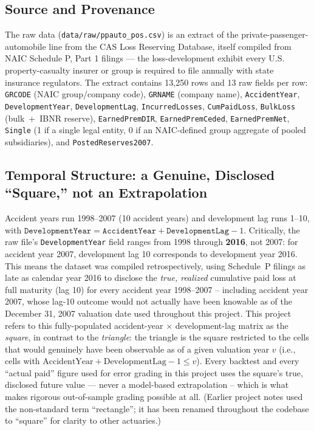 \documentclass[11pt]{article}
\begin{document}
\subsection{Source and Provenance}

The raw data (\texttt{data/raw/ppauto\_pos.csv}) is an extract of the private-passenger-automobile
line from the CAS Loss Reserving Database, itself compiled from NAIC Schedule P, Part 1 filings ---
the loss-development exhibit every U.S. property-casualty insurer or group is required to file
annually with state insurance regulators. The extract contains 13{,}250 rows and 13 raw fields per
row: \texttt{GRCODE} (NAIC group/company code), \texttt{GRNAME} (company name), \texttt{AccidentYear},
\texttt{DevelopmentYear}, \texttt{DevelopmentLag}, \texttt{IncurredLosses}, \texttt{CumPaidLoss},
\texttt{BulkLoss} (bulk~+~IBNR reserve), \texttt{EarnedPremDIR}, \texttt{EarnedPremCeded},
\texttt{EarnedPremNet}, \texttt{Single} (1 if a single legal entity, 0 if an NAIC-defined group
aggregate of pooled subsidiaries), and \texttt{PostedReserves2007}.

\subsection{Temporal Structure: a Genuine, Disclosed ``Square,'' not an Extrapolation}
\label{sec:square}

Accident years run 1998--2007 (10 accident years) and development lag runs 1--10, with
$\texttt{DevelopmentYear} = \texttt{AccidentYear} + \texttt{DevelopmentLag} - 1$. Critically, the
raw file's \texttt{DevelopmentYear} field ranges from 1998 through \textbf{2016}, not 2007: for
accident year 2007, development lag 10 corresponds to development year 2016. This means the
dataset was compiled retrospectively, using Schedule~P filings as late as calendar year 2016 to
disclose the \emph{true, realized} cumulative paid loss at full maturity (lag 10) for every
accident year 1998--2007 -- including accident year 2007, whose lag-10 outcome would not actually
have been knowable as of the December 31, 2007 valuation date used throughout this project. This
project refers to this fully-populated accident-year $\times$ development-lag matrix as the
\emph{square}, in contrast to the \emph{triangle}: the triangle is the square restricted to the
cells that would genuinely have been observable as of a given valuation year $v$ (i.e., cells with
$\text{AccidentYear} + \text{DevelopmentLag} - 1 \le v$). Every backtest and every ``actual paid''
figure used for error grading in this project uses the square's true, disclosed future value ---
never a model-based extrapolation -- which is what makes rigorous out-of-sample grading possible
at all. (Earlier project notes used the non-standard term ``rectangle''; it has been renamed
throughout the codebase to ``square'' for clarity to other actuaries.)
\end{document}
